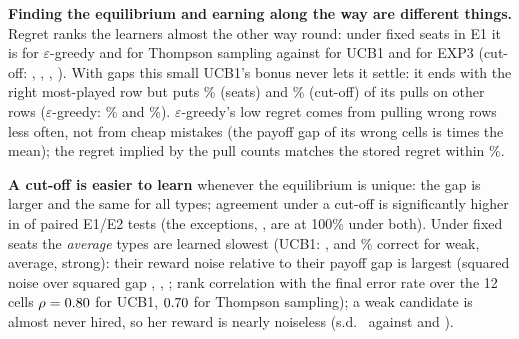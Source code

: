\documentclass[conference]{IEEEtran}
\theoremstyle{plain}
\theoremstyle{definition}\newtheorem{definition}{Definition}
\newcommand{\E}{\mathbb{E}}\newcommand{\1}{\mathbf{1}}
\newcommand{\finding}[1]{\textbf{#1}}
\begin{document}
\begin{table}[t]\centering\small
\caption{Median rounds to 90\% agreement in all three leak models (``never ($x$\%)'' as in Table~\ref{tab:x3}).}\label{tab:rounds90}
\resizebox{\columnwidth}{!}{}
\end{table}
\begin{table}[t]\centering\small
\caption{What a sharing pattern is worth (E1, two friend groups, $\alpha=0.2$): the baselines of the review and the profile each learner settled on (most-played rows; mean over \XthreeSeeds{} seeds). Welfare: sum of expected utilities (under fixed seats the same for every pattern up to $c$, so omitted). Company value: $\E[V]$.}\label{tab:baselines}
\resizebox{\columnwidth}{!}{}
\end{table}
\finding{Finding the equilibrium and earning along the way are different things.} Regret ranks the learners almost the other way round: under fixed seats in E1 it is \RegretEpsEoneSeats{} for $\varepsilon$-greedy and
\RegretTsEoneSeats{} for Thompson sampling against \RegretUcbEoneSeats{} for UCB1 and \RegretExpEoneSeats{} for EXP3 (cut-off: \RegretEpsEoneBar, \RegretTsEoneBar, \RegretUcbEoneBar, \RegretExpEoneBar).
With gaps this small UCB1's bonus never lets it settle: it ends with the right most-played row but puts \ExpWrongUcbSeats\% (seats) and \ExpWrongUcbBar\% (cut-off) of its pulls on other rows ($\varepsilon$-greedy: \ExpWrongEpsSeats\% and \ExpWrongEpsBar\%).
$\varepsilon$-greedy's low regret comes from pulling wrong rows less often, not from cheap mistakes (the payoff gap of its wrong cells is \ExpMistakeGapEpsSeats{} times the mean); the regret implied by the pull counts matches the stored regret within \ExpCostMatchPct\%.

\finding{A cut-off is easier to learn} whenever the equilibrium is unique: the gap is larger and the same for all types; agreement under a cut-off is significantly higher in \BarSeatsSig{} of \BarSeatsTests{} paired E1/E2 tests (the exceptions, \BarSeatsNotSigLearners, are at 100\% under both).
Under fixed seats the \emph{average} types are learned slowest (UCB1: \TypeUcbEoneSeatsWeak, \TypeUcbEoneSeatsAvg{} and \TypeUcbEoneSeatsStrong\% correct for weak, average, strong): their reward noise relative to their payoff gap is largest
(squared noise over squared gap \ExpSnrWeak, \ExpSnrAvg, \ExpSnrStrong; rank correlation with the final error rate over the 12 cells $\rho=0.80$ for UCB1, $0.70$ for Thompson sampling); a weak candidate is almost never hired, so her reward is nearly noiseless (s.d.\ \ExpSdWeak{} against \ExpSdAvg{} and \ExpSdStrong).
\end{document}
